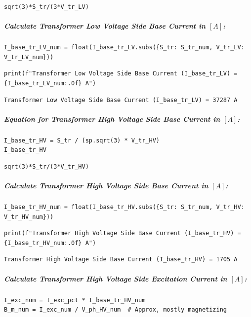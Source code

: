 \begin{verbatim}
sqrt(3)*S_tr/(3*V_tr_LV)
\end{verbatim}

\subparagraph{Calculate Transformer Low Voltage Side Base Current in $\left[A\right]$:}

\begin{verbatim}
I_base_tr_LV_num = float(I_base_tr_LV.subs({S_tr: S_tr_num, V_tr_LV: V_tr_LV_num}))
\end{verbatim}

\begin{verbatim}
print(f"Transformer Low Voltage Side Base Current (I_base_tr_LV) = {I_base_tr_LV_num:.0f} A")
\end{verbatim}

\begin{verbatim}
Transformer Low Voltage Side Base Current (I_base_tr_LV) = 37287 A
\end{verbatim}

\subparagraph{Equation for Transformer High Voltage Side Base Current in $\left[A\right]$:}

\begin{verbatim}
I_base_tr_HV = S_tr / (sp.sqrt(3) * V_tr_HV)
I_base_tr_HV
\end{verbatim}

\begin{verbatim}
sqrt(3)*S_tr/(3*V_tr_HV)
\end{verbatim}

\subparagraph{Calculate Transformer High Voltage Side Base Current in $\left[A\right]$:}

\begin{verbatim}
I_base_tr_HV_num = float(I_base_tr_HV.subs({S_tr: S_tr_num, V_tr_HV: V_tr_HV_num}))
\end{verbatim}

\begin{verbatim}
print(f"Transformer High Voltage Side Base Current (I_base_tr_HV) = {I_base_tr_HV_num:.0f} A")
\end{verbatim}

\begin{verbatim}
Transformer High Voltage Side Base Current (I_base_tr_HV) = 1705 A
\end{verbatim}

\subparagraph{Calculate Transformer High Voltage Side Excitation Current in $\left[A\right]$:}

\begin{verbatim}
I_exc_num = I_exc_pct * I_base_tr_HV_num
B_m_num = I_exc_num / V_ph_HV_num  # Approx, mostly magnetizing
\end{verbatim}

